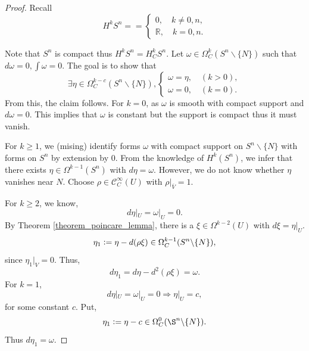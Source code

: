 \documentclass[10pt]{article}
\newcommand{\defeq}{\vcentcolon=}
\newcommand{\R}[0]{\mathbb{R}}
\newcommand{\cinf}[0]{\mathcal{C}^\infty}
\begin{document}
\begin{proof}
  Recall 
  \begin{equation*}
    H^k S^n==\begin{cases}
      0,\quad k\not=0,n,\\
      \R,\quad k=0,n.
    \end{cases}
  \end{equation*}
  \begin{center}
  \end{center}
  Note that $S^n$ is compact thus $H^kS^n=H^k_CS^n$. Let $\omega\in\Omega_C^k(S^n\backslash\{N\})$ such that $d\omega=0,\int\omega=0$. The goal is to show that 
  \begin{equation*}
    \exists \eta\in\Omega^{k-c}_C(S^n\backslash\{N\}),\begin{cases}
      \omega = \eta,\quad (k>0),\\
      \omega = 0,\quad (k=0).
    \end{cases}
  \end{equation*}
  From this, the claim follows. For $k=0$, as $\omega$ is smooth with compact support and $d\omega = 0$. This implies that $\omega$ is constant but the support is compact thus it must vanish.
  \par For $k\geq1$, we (mising) identify forms $\omega$ with compact support on $S^n\backslash\{N\}$ with forms on $S^n$ by extension by $0$. From the knowledge of $H^k(S^n)$, we infer that there exists $\eta\in\Omega^{k-1}(S^n)$ with $d\eta=\omega$. However, we do not know whether $\eta$ vanishes near $N$.
  Choose $\rho\in\cinf_C(U)$ with $\rho|_{\overline{V}}=1$.
  \par For $k\geq 2$, we know,\
  \begin{equation*}
    d\eta|_U=\omega|_U=0.
  \end{equation*}
  By Theorem \ref{theorem_poincare_lemma}, there is a $\xi\in\Omega^{k-2}(U)$ with $d\xi=\eta|_U$.
  \begin{equation*}
    \eta_1\defeq \eta-d(\rho\xi)\in\Omega_C^{k-1}(S^n\backslash\{N\}),
  \end{equation*}
  since $\eta_1|_V=0$. Thus,
  \begin{equation*}
    d\eta_1=d\eta-d^2(\rho\xi)=\omega.
  \end{equation*}
  For $k=1$, 
  \begin{equation*}
    d\eta|_U=\omega|_U=0\Rightarrow\eta|_U=c,
  \end{equation*}
  for some constant $c$. Put,
  \begin{equation*}
    \eta_1\defeq \eta-c\in\Omega^0_C(\S^n\backslash\{N\}).
  \end{equation*}
  Thus $d\eta_1=\omega$.
\end{proof}
\end{document}
